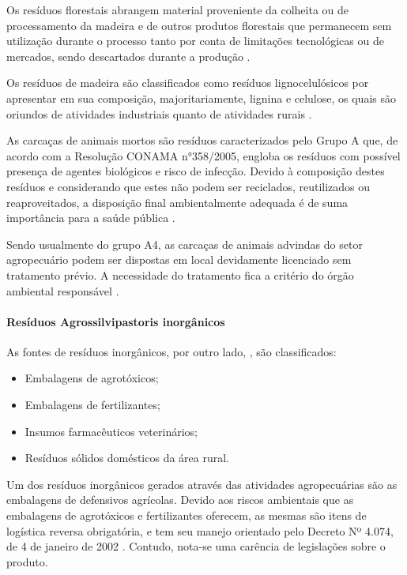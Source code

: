 	Os resíduos florestais abrangem material proveniente da colheita ou de processamento da madeira e de outros produtos florestais que permanecem sem utilização durante o processo tanto por conta de limitações tecnológicas ou de mercados, sendo descartados durante a produção \cite{Nolasco2000}. 
	
	Os resíduos de madeira são classificados como resíduos lignocelulósicos por apresentar em sua composição, majoritariamente, lignina e celulose, os quais são oriundos de atividades industriais quanto de atividades rurais \cite{TEIXEIRA2005}.
	
	As carcaças de animais mortos são resíduos caracterizados pelo Grupo A que, de acordo com a Resolução CONAMA n°358/2005, engloba os resíduos com possível presença de agentes biológicos e risco de infecção. Devido à composição destes resíduos e considerando que estes não podem ser reciclados, reutilizados ou reaproveitados, a disposição final ambientalmente adequada é de suma importância para a saúde pública \cite{conama:358}.
	
	Sendo usualmente do grupo A4, as carcaças de animais advindas do setor agropecuário podem ser dispostas em local devidamente licenciado sem tratamento prévio. A necessidade do tratamento fica a critério do órgão ambiental responsável \cite{conama:358}.
	
	\paragraph{Resíduos Agrossilvipastoris inorgânicos}
	
	As fontes de resíduos inorgânicos, por outro lado, \cite{MMA2012}, são classificados:
	
	\begin{itemize}
		\item 	Embalagens de agrotóxicos;
		\item   Embalagens de fertilizantes;
		\item 	Insumos farmacêuticos veterinários;
		\item   Resíduos sólidos domésticos da área rural.
	\end{itemize}

	Um dos resíduos inorgânicos gerados através das atividades agropecuárias são as embalagens de defensivos agrícolas. Devido aos riscos ambientais que as embalagens de agrotóxicos e fertilizantes oferecem, as mesmas são itens de logística reversa obrigatória, e tem seu manejo orientado pelo Decreto Nº 4.074, de 4 de janeiro de 2002 \cite{Brasil4074}. Contudo, nota-se uma carência de legislações sobre o produto.
	
